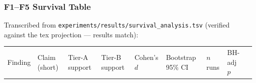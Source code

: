 \documentclass[
  american,
  11pt,
  a4paper,
  oneside]{report}
\newcounter{none} %
\begin{document}
\subsubsection{F1--F5 Survival Table}\label{f1f5-survival-table}

Transcribed from \texttt{experiments/results/survival\_analysis.tsv}
(verified against the tex projection --- results match):

{\def\LTcaptype{none} %
\begin{longtable}[]{@{}
  >{\raggedright\arraybackslash}p{}
  >{\raggedright\arraybackslash}p{}
  >{\raggedright\arraybackslash}p{}
  >{\raggedright\arraybackslash}p{}
  >{\raggedright\arraybackslash}p{}
  >{\raggedright\arraybackslash}p{}
  >{\raggedright\arraybackslash}p{}
  >{\raggedright\arraybackslash}p{}
  >{\raggedright\arraybackslash}p{}@{}}
\toprule\noalign{}
\begin{minipage}[b]{\linewidth}\raggedright
Finding
\end{minipage} & \begin{minipage}[b]{\linewidth}\raggedright
Claim (short)
\end{minipage} & \begin{minipage}[b]{\linewidth}\raggedright
Tier-A support
\end{minipage} & \begin{minipage}[b]{\linewidth}\raggedright
Tier-B support
\end{minipage} & \begin{minipage}[b]{\linewidth}\raggedright
Cohen's \(d\)
\end{minipage} & \begin{minipage}[b]{\linewidth}\raggedright
Bootstrap 95\% CI
\end{minipage} & \begin{minipage}[b]{\linewidth}\raggedright
\(n\) runs
\end{minipage} & \begin{minipage}[b]{\linewidth}\raggedright
BH-adj \(p\)
\end{minipage} & \begin{minipage}[b]{\linewidth}\raggedright

\end{minipage}
\end{longtable}}
\end{document}
